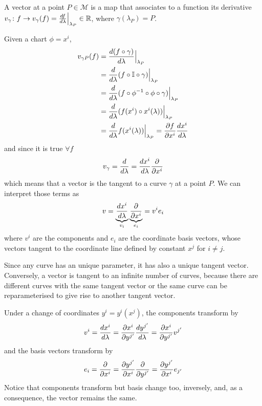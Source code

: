     \begin{definition}[Vector]
        A vector at a point $P \in \mathcal M$ is a map that associates to a function its derivative $v_{\gamma} \colon f \rightarrow v_\gamma(f) = \frac{df}{d\lambda}\Big\vert_{\lambda_P} \in \mathbb R$, where $\gamma(\lambda_P) = P$.
    \end{definition} 
    \noindent Given a chart $\phi = x^i$,
    \begin{equation*}
    \begin{aligned}
        v_{\gamma P} (f) & = \frac{d(f \circ \gamma)}{d\lambda} \Big\vert_{\lambda_P} \\ & = \frac{d}{d\lambda} (f \circ \mathbb I \circ \gamma) \Big\vert_{\lambda_P} \\ & = \frac{d}{d\lambda} (f \circ \phi^{-1} \circ \phi \circ \gamma) \Big\vert_{\lambda_P} \\ & = \frac{d}{d\lambda} (f(x^i) \circ x^i(\lambda)) \Big\vert_{\lambda_P} \\ & = \frac{d}{d\lambda} f(x^i(\lambda)) \Big\vert_{\lambda_P} = \frac{\partial f}{\partial x^i} \frac{dx^i}{d\lambda}
    \end{aligned}
    \end{equation*}
    and since it is true $\forall f$
    \begin{equation*}
        v_\gamma = \frac{d}{d\lambda} = \frac{dx^i}{d\lambda} \frac{\partial}{\partial x^i} 
    \end{equation*}
    which means that a vector is the tangent to a curve $\gamma$ at a point $P$. We can interpret those terms as
    \begin{equation*}
        v = \underbrace{\frac{dx^i}{d\lambda}}_{v_i} \underbrace{\frac{\partial}{\partial x^i}}_{e_i} = v^i e_i
    \end{equation*}
    where $v^i$ are the components and $e_i$ are the coordinate basis vectors, whose vectors tangent to the coordinate line defined by constant $x^j$ for $i \neq j$.

    Since any curve has an unique parameter, it has also a unique tangent vector. Conversely, a vector is tangent to an infinite number of curves, because there are different curves with the same tangent vector or the same curve can be reparameterised to give rise to another tangent vector.

    Under a change of coordinates $y^i = y^i(x^j)$, the components transform by 
    \begin{equation*}
        v^i = \frac{dx^i}{d\lambda} = \frac{\partial x^i}{\partial y^{j'}} \frac{dy^{j'}}{d\lambda} = \frac{\partial x^i}{\partial y^{j'}} v^{j'}
    \end{equation*}
    and the basis vectors transform by 
    \begin{equation*}
        e_i = \frac{\partial}{\partial x^i} = \frac{\partial y^{j'}}{\partial x^i} \frac{\partial}{\partial y^{j'}} = \frac{\partial y^{j'}}{\partial x^i} e_{j'}
    \end{equation*}
    \noindent Notice that components transform but basis change too, inversely, and, as a consequence, the vector remains the same.

